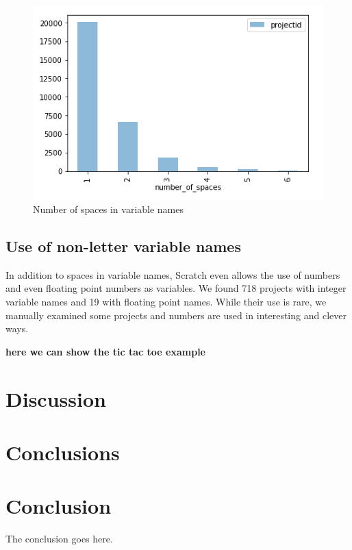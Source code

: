 \documentclass[conference]{IEEEtran}
\newcommand{\todo}[1]{ \textbf{#1} }
\begin{document}
\begin{figure}
	\begin{center}
		\includegraphics[width=\columnwidth]{fig/number_of_spaces}
		\caption{Number of spaces in variable names}
		\label{fig:number_of_spaces}
	\end{center}
\end{figure} 

\subsection{Use of non-letter variable names}
In addition to spaces in variable names, Scratch even allows the use of numbers and even floating point numbers as variables. We found 718 projects with integer variable names and 19 with floating point names. While their use is rare, we manually examined some projects and numbers are used in interesting and clever ways.

\todo{here we can show the tic tac toe example}

 \section{Discussion}
 \section{Conclusions}

\section{Conclusion}
The conclusion goes here.




\end{document}
